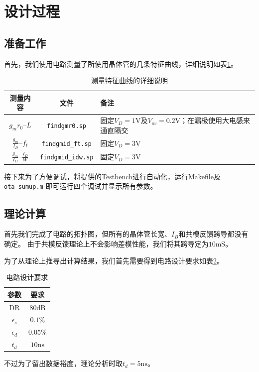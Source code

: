 \documentclass[a4paper]{article}
\newcommand{\uV}{\si{\volt}}
\newcommand{\uns}{\si{\nano\second}}
\newcommand{\umS}{\si{\milli\siemens}}
\newcommand{\udB}{\si{\deci\bel}}
\begin{document}
\section{设计过程}
\subsection{准备工作}
首先，我们使用电路测量了所使用晶体管的几条特征曲线，详细说明如表\ref{finds}。
\begin{table}[htb]
  \begin{center}
    \begin{tabular}{ccp{5cm}}
      测量内容 & 文件 & 备注 \\\hline
      $g_mr_0$--$L$ & \texttt{findgmr0.sp} & 
            固定$V_D=1\uV$及$V_{ov}=0.2\uV$；在漏极使用大电感来通直隔交 \\
      $\frac{g_m}{I_D}$--$f_t$ & \texttt{findgmid\_ft.sp} &
            固定$V_D=3\uV$    \\
      $\frac{g_m}{I_D}$--$\frac{I_D}{W}$ & \texttt{findgmid\_idw.sp} &
            固定$V_D=3\uV$    
    \end{tabular}
  \end{center}
  \caption{测量特征曲线的详细说明}
  \label{finds}
\end{table}

接下来为了方便调试，将提供的Testbench进行自动化，运行Makefile及\texttt{ota\_sumup.m}
即可运行四个调试并显示所有参数。

\subsection{理论计算}
首先我们完成了电路的拓扑图，但所有的晶体管长宽、$I_B$和共模反馈跨导都没有确定。
由于共模反馈理论上不会影响差模性能，我们将其跨导定为$10\umS$。

为了从理论上推导出计算结果，我们首先需要得到电路设计要求如表\ref{requirements}。
\begin{table}[htb]
  \begin{center}
    \begin{tabular}{cc}
      参数 & 要求 \\\hline
      DR & $80\udB$ \\
      $\epsilon_s$ & $0.1\%$ \\
      $\epsilon_d$ & $0.05\%$ \\
      $t_d$ & $10\uns$ \\
    \end{tabular}
  \end{center}
  \caption{电路设计要求}
  \label{requirements}
\end{table}
不过为了留出数据裕度，理论分析时取$t_d=5\uns$。
\end{document}
